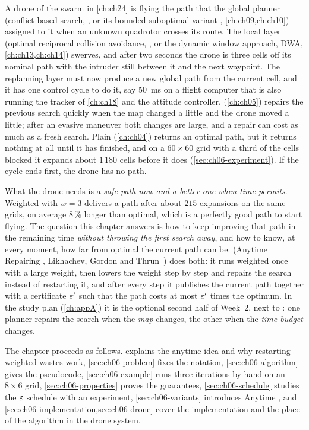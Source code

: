 A drone of the swarm in \cref{ch:ch24} is flying the path that the global
planner (conflict-based search, \cbs, or its bounded-suboptimal variant
\ecbs, \cref{ch:ch09,ch:ch10}) assigned to it when an unknown quadrotor
crosses its route. The local layer (optimal reciprocal collision avoidance,
\orca, or the dynamic window approach, DWA, \cref{ch:ch13,ch:ch14}) swerves, and after two seconds the drone is three
cells off its nominal path with the intruder still between it and the next
waypoint. The replanning layer must now produce a new global path from the
current cell, and it has one control cycle to do it, say $50$~ms on a flight
computer that is also running the tracker of \cref{ch:ch18} and the attitude
controller. \dstarlite (\cref{ch:ch05}) repairs the previous search quickly
when the map changed a little and the drone moved a little; after an evasive
maneuver both changes are large, and a repair can cost as much as a fresh
search. Plain \astar (\cref{ch:ch04}) returns an optimal path, but it returns
nothing at all until it has finished, and on a $60 \times 60$ grid with a third
of the cells blocked it expands about $1\,180$ cells before it does
(\cref{sec:ch06-experiment}). If the cycle ends first, the drone has no path.

What the drone needs is a \emph{safe path now and a better one when time
permits}. Weighted \astar with $w = 3$ delivers a path after about $215$
expansions on the same grids, on average $8\,\%$ longer than optimal, which is
a perfectly good path to start flying. The question this chapter answers is
how to keep improving that path in the remaining time \emph{without throwing
the first search away}, and how to know, at every moment, how far from optimal
the current path can be. \arastar{} (Anytime Repairing \astar,
Likhachev, Gordon and Thrun~\cite{likhachev2003ara}) does both: it runs
weighted \astar once with a large weight, then lowers the weight step by step
and repairs the search instead of restarting it, and after every step it
publishes the current path together with a certificate $\varepsilon'$ such that the
path costs at most $\varepsilon'$ times the optimum. In the study plan
(\cref{ch:appA}) it is the optional second half of Week~2, next to \dstarlite:
one planner repairs the search when the \emph{map} changes, the other when the
\emph{time budget} changes.

The chapter proceeds as follows.  explains the anytime
idea and why restarting weighted \astar wastes work, \cref{sec:ch06-problem}
fixes the notation, \cref{sec:ch06-algorithm} gives the pseudocode,
\cref{sec:ch06-example} runs three iterations by hand on an $8 \times 6$ grid,
\cref{sec:ch06-properties} proves the guarantees, \cref{sec:ch06-schedule}
studies the $\varepsilon$ schedule with an experiment, \cref{sec:ch06-variants}
introduces Anytime \dstar, and \cref{sec:ch06-implementation,sec:ch06-drone}
cover the implementation and the place of the algorithm in the drone system.

